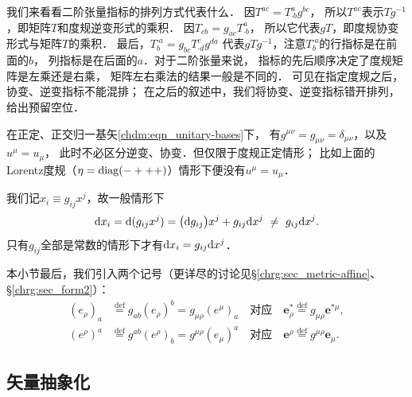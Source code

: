 我们来看看二阶张量指标的排列方式代表什么．
因$T^{ac}=T^{a}_{\cdot b}g^{bc}$，
所以$T^{ac}$表示$Tg^{-1}$，即矩阵$T$和度规逆变形式的乘积．
因$T_{cb}=g_{ac}T^{a}_{\cdot b}$，
所以它代表$g T$，即度规协变形式与矩阵$T$的乘积．
最后，$T^{\cdot a}_{b}=g_{bc}T^{c}_{\cdot d}g^{da}$
代表$g T g^{-1}$，注意$T^{\cdot a}_{b}$的行指标是在前面的$b$，
列指标是在后面的$a$．对于二阶张量来说，
指标的先后顺序决定了度规矩阵是左乘还是右乘，
矩阵左右乘法的结果一般是不同的．
可见在指定度规之后，协变、逆变指标不能混排；
在之后的叙述中，我们将协变、逆变指标错开排列，给出预留空位．

在{\kaishu 正定、正交归一}基矢\eqref{chdm:eqn_unitary-bases}下，
有$g^{\mu\nu}=g_{\mu\nu}=\delta_{\mu\nu}$，以及$u^\mu = u_\mu$，
此时不必区分逆变、协变．但仅限于度规正定情形；
比如上面的Lorentz度规（$\eta={\rm diag}(-+++)$）情形下便没有$u^\mu = u_\mu$．

我们记$x_i \equiv g_{ij}x^j$，故一般情形下
\begin{align}
	{\rm d}x_i = {\rm d}(g_{ij}x^j) = \bigl({\rm d}g_{ij}\bigr)x^j+ g_{ij}{\rm d}x^j
	\  \neq \ g_{ij}{\rm d}x^j.
\end{align}
只有$g_{ij}$全部是常数的情形下才有${\rm d}x_i =g_{ij}{\rm d}x^j$．


本小节最后，我们引入两个记号（更详尽的讨论见\S\ref{chrg:sec_metric-affine}、\S\ref{chrg:sec_form2}）：
\begin{subequations}\label{chdm:eqn_eiud}
	\begin{align}
		(e_\rho)_a &\overset{\mathrm {def}}{=} g_{ab}(e_\rho)^b 
		= g_{\mu\rho}(e^\mu)_a
		\quad \text{对应}\quad 
		\boldsymbol{e}_\rho ^* \overset{\mathrm {def}}{=} g_{\mu\rho} \boldsymbol{e}^{*\mu}, \\
		(e^\rho)^a &\overset{\mathrm {def}}{=} g^{ab}(e^\rho)_b 
		= g^{\mu\rho}(e_\mu)^a 
		\quad \text{对应}\quad 
		\boldsymbol{e}^\rho \overset{\mathrm {def}}{=} g^{\mu\rho} \boldsymbol{e}_{\mu} .
	\end{align}
\end{subequations}






\subsection{矢量抽象化}\label{chdm:sec_vector-abstract2geo}


